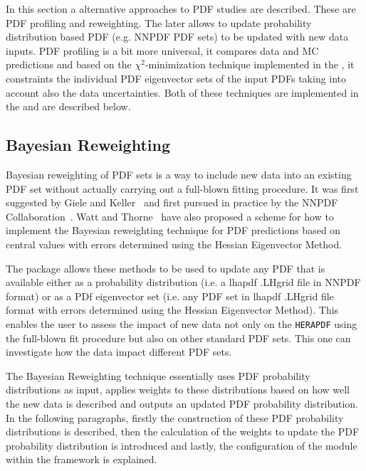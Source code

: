 In this section a alternative approaches to PDF studies are described. These are PDF profiling and reweighting. The later allows to update probability distribution based PDF (e.g. NNPDF PDF sets) to be updated with new data inputs. PDF profiling is a bit more universal, it compares data and MC predictions and based on the $\chi^2$-minimization technique implemented in the \fitter, it constraints the individual PDF eigenvector sets of the input PDFs taking into account also the data uncertainties. Both of these techniques are implemented in the \fitter and are described below.


\subsection{Bayesian Reweighting}

Bayesian reweighting of PDF sets is a way to include new data into an existing PDF set without actually carrying out a full-blown fitting procedure. 
It was first suggested by Giele and Keller~\cite{Giele:1998gw} and first pursued in practice by the NNPDF Collaboration~\cite{Ball:2011gg,Ball:2010gb}. 
Watt and Thorne~\cite{Watt:2012tq} have also proposed a scheme for how to implement the Bayesian reweighting technique for PDF predictions based on central values with errors determined using the Hessian Eigenvector Method. 

%
The \fitter package allows these methods to be used to update any PDF that is available either as a probability distribution
(i.e. a lhapdf .LHgrid file in NNPDF format) or as a PDf eigenvector set 
(i.e. any PDF set in lhapdf .LHgrid file format with errors determined using the Hessian Eigenvector Method).
This enables the user to assess the impact of new data not only on the {\tt HERAPDF} using the full-blown fit procedure 
but also on other standard PDF sets. This one can investigate how the data impact different PDF sets.

The Bayesian Reweighting technique essentially uses PDF probability distributions as input, applies weights to these distributions based on how well the new data is described and outputs an updated PDF probability distribution. In the following paragraphs, firstly the construction of these PDF probability distributions is described, then the calculation of the weights to update the PDF probability distribution is introduced and lastly, the configuration of the module within the \fitter framework is explained.

